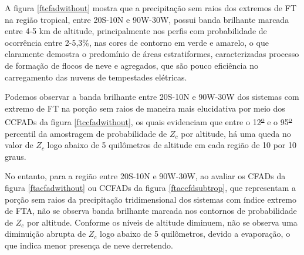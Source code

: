 


A figura \ref{ftcfadwithout} mostra que a precipitação sem raios dos extremos de FT na região tropical, entre 20S-10N e 90W-30W, possui banda brilhante marcada entre 4-5 km de altitude, principalmente nos perfis com probabilidade de ocorrência entre 2-5,3\%, nas cores de contorno em verde e amarelo, o que claramente demostra o predomínio de áreas estratiformes, caracterizadas processo de formação de flocos de neve e agregados, que são pouco eficiência no carregamento das nuvens de tempestades elétricas. 

Podemos observar a banda brilhante entre 20S-10N e 90W-30W  dos sistemas com  extremo de FT na porção sem raios de maneira mais elucidativa por meio dos CCFADs da figura \ref{ftccfadwithout}, os quais evidenciam que entre o 12\textsuperscript{\underline{o}} e o 95\textsuperscript{\underline{o}} percentil da amostragem de probabilidade de $Z_c$ por altitude, há uma queda no valor de $Z_c$ logo abaixo de 5 quilômetros de altitude em cada região de 10 por 10 graus. 

No entanto, para a região entre 20S-10N e 90W-30W, ao avaliar os CFADs da figura \ref{ftacfadwithout} ou CCFADs da figura \ref{ftaccfdsubtrop}, que representam a porção sem raios da precipitação tridimensional dos sistemas com índice extremo de FTA, não se observa banda brilhante marcada nos contornos de probabilidade de $Z_c$ por altitude. Conforme os níveis de altitude diminuem, não se observa uma diminuição abrupta de $Z_c$ logo abaixo de 5 quilômetros, devido a evaporação, o que indica menor presença de neve derretendo.


